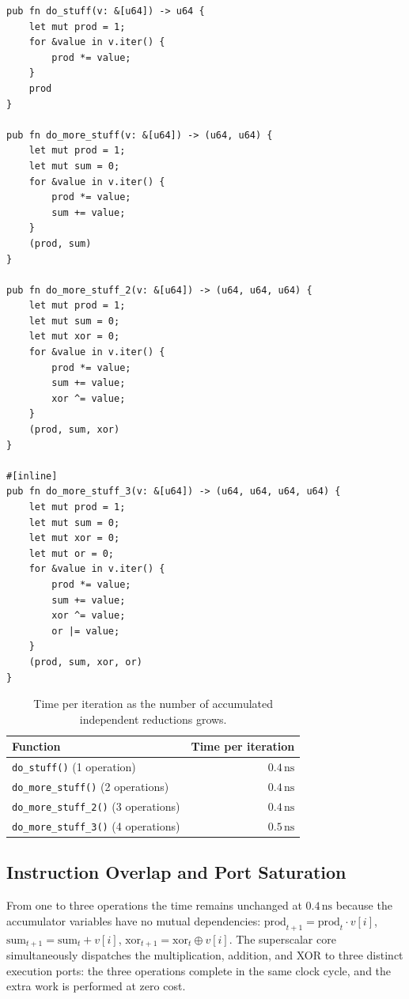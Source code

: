 \begin{lstlisting}[style=rustcode,caption={From a single reduction to four independent reductions per iteration.}]
pub fn do_stuff(v: &[u64]) -> u64 {
    let mut prod = 1;
    for &value in v.iter() {
        prod *= value;
    }
    prod
}

pub fn do_more_stuff(v: &[u64]) -> (u64, u64) {
    let mut prod = 1;
    let mut sum = 0;
    for &value in v.iter() {
        prod *= value;
        sum += value;
    }
    (prod, sum)
}

pub fn do_more_stuff_2(v: &[u64]) -> (u64, u64, u64) {
    let mut prod = 1;
    let mut sum = 0;
    let mut xor = 0;
    for &value in v.iter() {
        prod *= value;
        sum += value;
        xor ^= value;
    }
    (prod, sum, xor)
}

#[inline]
pub fn do_more_stuff_3(v: &[u64]) -> (u64, u64, u64, u64) {
    let mut prod = 1;
    let mut sum = 0;
    let mut xor = 0;
    let mut or = 0;
    for &value in v.iter() {
        prod *= value;
        sum += value;
        xor ^= value;
        or |= value;
    }
    (prod, sum, xor, or)
}
\end{lstlisting}

\begin{table}[H]
\centering
\small
\begin{tabular}{l r}
\toprule
\textbf{Function} & \textbf{Time per iteration} \\
\midrule
\texttt{do\_stuff()} (1 operation) & $0.4\,\text{ns}$ \\
\texttt{do\_more\_stuff()} (2 operations) & $0.4\,\text{ns}$ \\
\texttt{do\_more\_stuff\_2()} (3 operations) & $0.4\,\text{ns}$ \\
\texttt{do\_more\_stuff\_3()} (4 operations) & $0.5\,\text{ns}$ \\
\bottomrule
\end{tabular}
\caption{Time per iteration as the number of accumulated independent reductions grows.}
\label{tab:interleaving-arithmetic-en}
\end{table}

\subsection{Instruction Overlap and Port Saturation}

From one to three operations the time remains unchanged at $0.4\,\text{ns}$ because the accumulator variables have no mutual dependencies: $\text{prod}_{t+1} = \text{prod}_t \cdot v[i]$, $\text{sum}_{t+1} = \text{sum}_t + v[i]$, $\text{xor}_{t+1} = \text{xor}_t \oplus v[i]$. The superscalar core simultaneously dispatches the multiplication, addition, and XOR to three distinct execution ports: the three operations complete in the same clock cycle, and the extra work is performed at zero cost.

